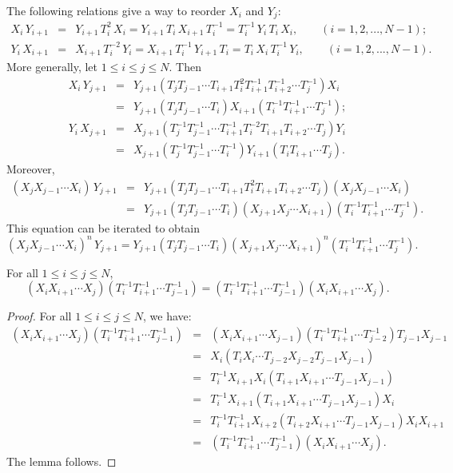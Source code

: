 The following relations give a way to reorder $X_i$ and $Y_{j}$:
\begin{eqnarray*}
X_i\,Y_{i+1}&=&Y_{i+1}\,T_i^{2}\,X_i=Y_{i+1}\,T_i \,X_{i+1}\,T_i^{-1}=
T_i^{-1}\,Y_i\, T_i \, X_i,\qquad (i=1,2,...,N-1);\label{firstxy}\\
Y_i \, X_{i+1}&=&X_{i+1} \, T_i^{-2} \, Y_i=X_{i+1} \, T_i^{-1}\, Y_{i+1}\,T_i=T_i\,X_i\,T_i^{-1}\,Y_i,\qquad (i=1,2,...,N-1).\label{secxy}
\end{eqnarray*}
More generally, let $1\leq i\leq j \leq N$. Then
\begin{eqnarray*} X_i \,Y_{j+1}&=&Y_{j+1}(T_jT_{j-1}\cdots T_{i+1} T_i^2 T_{i+1}^{-1}T_{i+2}^{-1}\cdots T_j^{-1})X_i\\
&=&Y_{j+1}(T_jT_{j-1}\cdots T_i)X_{i+1}(T_i^{-1}T_{i+1}^{-1}\cdots T_j^{-1});\\
Y_i \,X_{j+1}&=&X_{j+1}(T_j^{-1}T_{j-1}^{-1}\cdots T_{i+1}^{-1} T_i^{-2} T_{i+1}T_{i+2}\cdots T_j) Y_i\\
&=&X_{j+1}(T_j^{-1}T_{j-1}^{-1}\cdots T_i^{-1})Y_{i+1}(T_iT_{i+1}\cdots T_j).
\end{eqnarray*}
Moreover,
\begin{eqnarray*}
(X_j X_{j-1}\cdots X_i )\, Y_{j+1}
&=&Y_{j+1} (T_jT_{j-1}\cdots T_{i+1}T_i^2T_{i+1}T_{i+2}\cdots T_{j}) (X_j X_{j-1}\cdots X_i)\nonumber \\
&=& Y_{j+1} (T_jT_{j-1}\cdots T_i) (X_{j+1} X_{j}\cdots X_{i+1} ) (T_i^{-1}T_{i+1}^{-1}\cdots T_j^{-1})\label{comXY} .
\end{eqnarray*}
This equation can be iterated to obtain
\begin{equation}\label{gencoXY}
(X_j X_{j-1}\cdots X_i )^n\, Y_{j+1}
=Y_{j+1} (T_jT_{j-1}\cdots T_i) (X_{j+1} X_{j}\cdots X_{i+1})^n (T_i^{-1}T_{i+1}^{-1}\cdots T_j^{-1}).
\end{equation}

\begin{lemma}\label{comXT}
For all $1\leq i\leq j\leq N$, 
$$(X_iX_{i+1}\cdots X_j)(T_i^{-1}T_{i+1}^{-1}\cdots T_{j-1}^{-1})
=(T_i^{-1}T_{i+1}^{-1}\cdots T_{j-1}^{-1})(X_iX_{i+1}\cdots X_j).$$
\end{lemma}
\begin{proof}
For all $1\leq i\leq j\leq N$, we have:
\begin{eqnarray*}(X_iX_{i+1}\cdots X_j)(T_i^{-1}T_{i+1}^{-1}\cdots T_{j-1}^{-1})
&=&(X_iX_{i+1}\cdots X_{j-1})(T_i^{-1}T_{i+1}^{-1}\cdots T_{j-2}^{-1})T_{j-1}X_{j-1}\\
&=&X_i (T_iX_i \cdots T_{j-2}X_{j-2}T_{j-1}X_{j-1})\\
&=&T_i^{-1}X_{i+1}X_i(T_{i+1}X_{i+1}\cdots T_{j-1}X_{j-1})\\
&=&T_i^{-1}X_{i+1}(T_{i+1}X_{i+1}\cdots T_{j-1}X_{j-1})X_i\\
&=&T_i^{-1}T_{i+1}^{-1}X_{i+2}(T_{i+2}X_{i+1}\cdots T_{j-1}X_{j-1})X_iX_{i+1}\\
&=&(T_i^{-1}T_{i+1}^{-1}\cdots T_{j-1}^{-1})(X_iX_{i+1}\cdots X_j).
\end{eqnarray*}
The lemma follows.
\end{proof}

